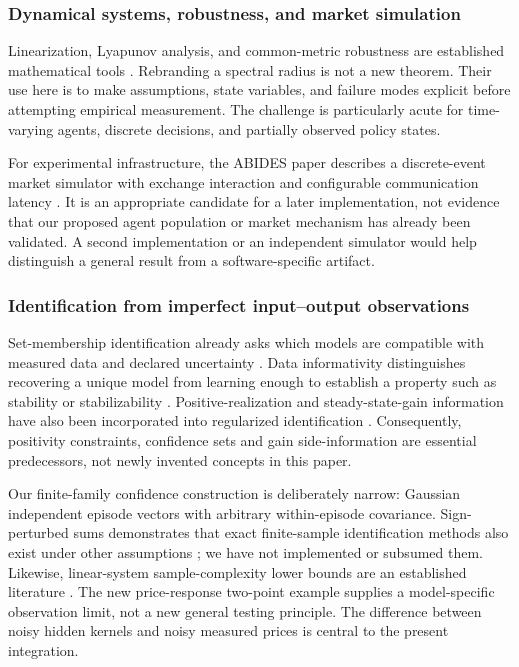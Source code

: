 \documentclass[10pt,twocolumn,letterpaper]{article}
\theoremstyle{definition}
\theoremstyle{remark}
\begin{document}
\subsubsection{Dynamical systems, robustness, and market simulation}
Linearization, Lyapunov analysis, and common-metric robustness are established mathematical tools \citep{khalil2002,boyd1994}. Rebranding a spectral radius is not a new theorem. Their use here is to make assumptions, state variables, and failure modes explicit before attempting empirical measurement. The challenge is particularly acute for time-varying agents, discrete decisions, and partially observed policy states.

For experimental infrastructure, the ABIDES paper describes a discrete-event market simulator with exchange interaction and configurable communication latency \citep{byrd2019}. It is an appropriate candidate for a later implementation, not evidence that our proposed agent population or market mechanism has already been validated. A second implementation or an independent simulator would help distinguish a general result from a software-specific artifact.

\subsubsection{Identification from imperfect input--output observations}
Set-membership identification already asks which models are compatible with measured data and declared uncertainty \citep{kosut1992}. Data informativity distinguishes recovering a unique model from learning enough to establish a property such as stability or stabilizability \citep{vanwaarde2020}. Positive-realization and steady-state-gain information have also been incorporated into regularized identification \citep{khosravi2025,khosravi2022}. Consequently, positivity constraints, confidence sets and gain side-information are essential predecessors, not newly invented concepts in this paper.

Our finite-family confidence construction is deliberately narrow: Gaussian independent episode vectors with arbitrary within-episode covariance. Sign-perturbed sums demonstrates that exact finite-sample identification methods also exist under other assumptions \citep{csaji2015}; we have not implemented or subsumed them. Likewise, linear-system sample-complexity lower bounds are an established literature \citep{jedra2019}. The new price-response two-point example supplies a model-specific observation limit, not a new general testing principle. The difference between noisy hidden kernels and noisy measured prices is central to the present integration.
\end{document}
